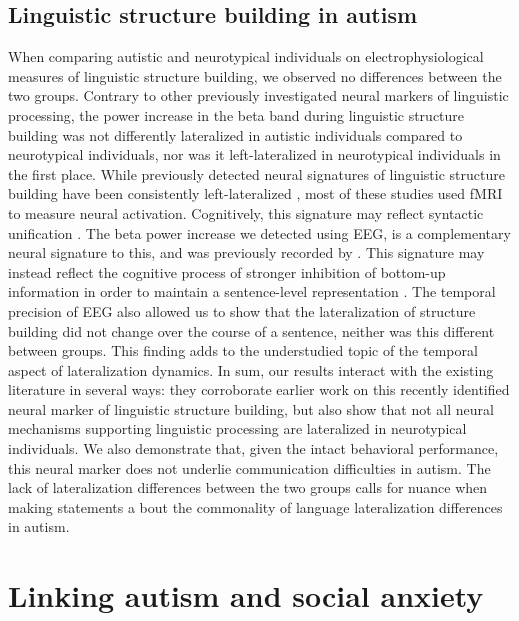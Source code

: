 \subsection{Linguistic structure building in autism}

When comparing autistic and neurotypical individuals on electrophysiological measures of linguistic structure building, we observed no differences between the two groups. Contrary to other previously investigated neural markers of linguistic processing, the power increase in the beta band during linguistic structure building was not differently lateralized in autistic individuals compared to neurotypical individuals, nor was it left-lateralized in neurotypical individuals in the first place. While previously detected neural signatures of linguistic structure building have been consistently left-lateralized \citep{hagoort2017,giglio2022,fedorenko2010,friederici2003}, most of these studies used fMRI to measure neural activation. Cognitively, this signature may reflect syntactic unification \citep{hagoort2017}. The beta power increase we detected using EEG, is a complementary neural signature to this, and was previously recorded by \cite{bastiaansen2010,bastiaansen2015}. This signature may instead reflect the cognitive process of stronger inhibition of bottom-up information in order to maintain a sentence-level representation \citep{miller2018,lewis2016}. The temporal precision of EEG also allowed us to show that the lateralization of structure building did not change over the course of a sentence, neither was this different between groups. This finding adds to the understudied topic of the temporal aspect of lateralization dynamics. In sum, our results interact with the existing literature in several ways: they corroborate earlier work on this recently identified neural marker of linguistic structure building, but also show that not all neural mechanisms supporting linguistic processing are lateralized in neurotypical individuals. We also demonstrate that, given the intact behavioral performance, this neural marker does not underlie communication difficulties in autism. The lack of lateralization differences between the two groups calls for nuance when making statements a  bout the commonality of language lateralization differences in autism.

\section{Linking autism and social anxiety}

